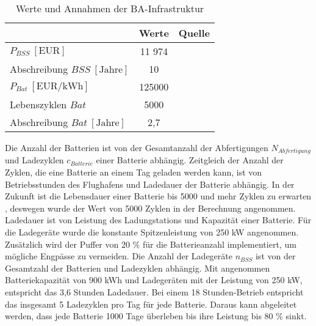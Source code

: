 

\begin{table}[h]
	\begin{center}
    \caption{Werte und Annahmen der BA-Infrastruktur}
	\label{BA_Infrastrukturtab}
	\begin{tabular}{|l|c|c|}
		\hline
		 & \textbf{Werte} & \textbf{Quelle} \\ \hline
		$P_{BSS} ~[\text{EUR}]$ &  11 974  & \cite{guo2020aviation} \\ \hline
      Abschreibung $BSS ~[\text{Jahre}]$&  10  & \cite{salucci2020optimal} \\ \hline
		$P_{Bat} ~[\text{EUR/kWh}]$ & 125000 & \cite{guo2020aviation} \\ \hline
      Lebenszyklen $Bat$ & 5000 & \cite{reimers2018introduction} \\ \hline
      Abschreibung $Bat ~[\text{Jahre}]$& 2,7 & \\ \hline

	\end{tabular}
    \end{center}
\end{table}

Die Anzahl der Batterien ist von der Gesamtanzahl der Abfertigungen $N_{Abfertigung}$ und Ladezyklen $c_{Batterie}$ einer Batterie abhängig. 
Zeitgleich der Anzahl der Zyklen, die eine Batterie an einem Tag geladen werden kann, ist von Betriebsstunden des Flughafens und 
Ladedauer der Batterie abhängig. In der Zukunft ist die Lebensdauer einer Batterie bis 5000 und mehr Zyklen zu erwarten \cite{reimers2018introduction}, 
deswegen wurde der Wert von 5000 Zyklen in der Berechnung angenommen.
Ladedauer ist von Leistung des Ladungstations und Kapazität einer Batterie.
Für die Ladegeräte wurde die konstante Spitzenleistung von 250 kW angenommen. %
Zusätzlich wird der Puffer von 20 \% für die Batterieanzahl implementiert, um mögliche Engpässe zu vermeiden. 
Die Anzahl der Ladegeräte $n_{BSS}$ ist von der Gesamtzahl der Batterien und Ladezyklen abhängig.
\cite{salucci2020optimal}
Mit angenommen Batteriekapazität von 900 kWh und Ladegeräten mit der Leistung von 250 kW, entspricht das 3,6 Stunden Ladedauer.
Bei einem 18 Stunden-Betrieb entspricht das insgesamt 5 Ladezyklen pro Tag für jede Batterie. Daraus kann abgeleitet werden, dass
jede Batterie 1000 Tage überleben bis ihre Leistung bis 80 \% sinkt.

